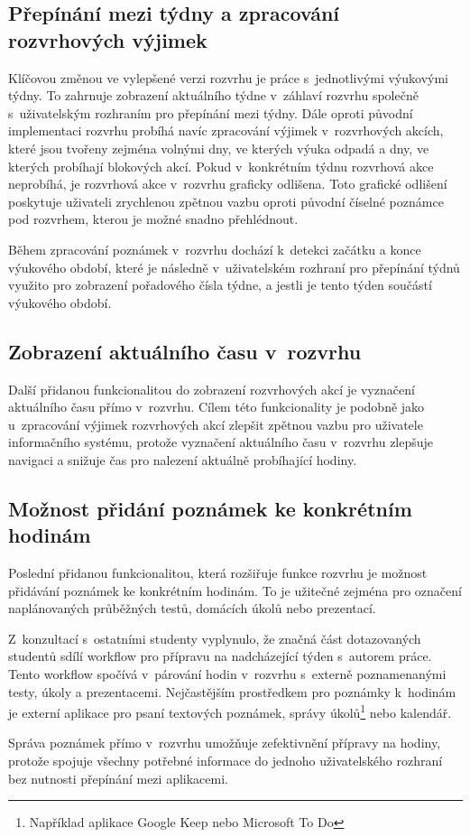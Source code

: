 \subsection{Přepínání mezi týdny a zpracování rozvrhových výjimek}

Klíčovou změnou ve vylepšené verzi rozvrhu je práce s~jednotlivými výukovými týdny. To zahrnuje zobrazení aktuálního týdne v~záhlaví rozvrhu společně s~uživatelským rozhraním pro přepínání mezi týdny. Dále oproti původní implementaci rozvrhu probíhá navíc zpracování výjimek v~rozvrhových akcích, které jsou tvořeny zejména volnými dny, ve kterých výuka odpadá a dny, ve kterých probíhají blokových akcí. Pokud v~konkrétním týdnu rozvrhová akce neprobíhá, je rozvrhová akce v~rozvrhu graficky odlišena. Toto grafické odlišení poskytuje uživateli zrychlenou zpětnou vazbu oproti původní číselné poznámce pod rozvrhem, kterou je možné snadno přehlédnout.

Během zpracování poznámek v~rozvrhu dochází k~detekci začátku a konce výukového období, které je následně v~uživatelském rozhraní pro přepínání týdnů využito pro zobrazení pořadového čísla týdne, a jestli je tento týden součástí výukového období.

\subsection{Zobrazení aktuálního času v~rozvrhu}

Další přidanou funkcionalitou do zobrazení rozvrhových akcí je vyznačení aktuálního času přímo v~rozvrhu. Cílem této funkcionality je podobně jako u~zpracování výjimek rozvrhových akcí zlepšit zpětnou vazbu pro uživatele informačního systému, protože vyznačení aktuálního času v~rozvrhu zlepšuje navigaci a snižuje čas pro nalezení aktuálně probíhající hodiny. 

\subsection{Možnost přidání poznámek ke konkrétním hodinám}

Poslední přidanou funkcionalitou, která rozšiřuje funkce rozvrhu je možnost přidávání poznámek ke konkrétním hodinám. To je užitečné zejména pro označení naplánovaných průběžných testů, domácích úkolů nebo prezentací. 

Z~konzultací s~ostatními studenty vyplynulo, že značná část dotazovaných studentů sdílí workflow pro přípravu na nadcházející týden s~autorem práce. Tento workflow spočívá v~párování hodin v~rozvrhu s~externě poznamenanými testy, úkoly a prezentacemi. Nejčastějším prostředkem pro poznámky k~hodinám je externí aplikace pro psaní textových poznámek, správy úkolů\footnote{Například aplikace Google Keep nebo Microsoft To Do} nebo kalendář.

Správa poznámek přímo v~rozvrhu umožňuje zefektivnění přípravy na hodiny, protože spojuje všechny potřebné informace do jednoho uživatelského rozhraní bez nutnosti přepínání mezi aplikacemi.
